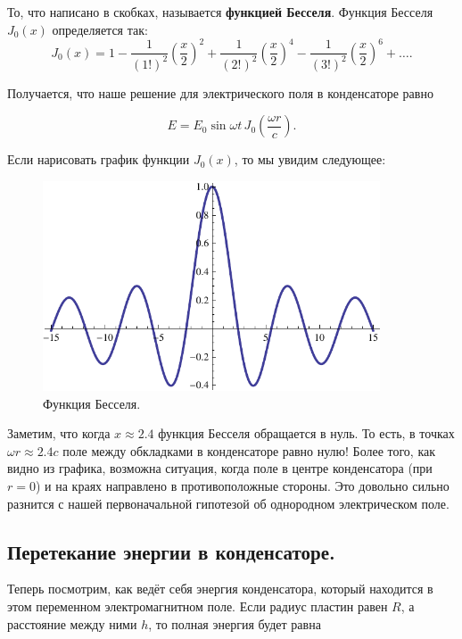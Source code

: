 \documentclass[11pt,a4paper]{article}
\numberwithin{equation}{section}
\begin{document}
То, что написано в скобках, называется \textbf{функцией
  Бесселя}. Функция Бесселя $J_0(x)$ определяется так: 
\begin{equation}
  \label{eq:def_bessel}
  J_0 (x) = 1 - \frac{1}{(1!)^2} \left(\frac{x}{2} \right)^2 +
  \frac{1}{(2!)^2} \left(\frac{x}{2} \right)^4 -  \frac{1}{(3!)^2}
  \left(\frac{x}{2} \right)^6 + \ldots.
\end{equation}

Получается, что наше решение для электрического поля в конденсаторе
равно 

\begin{equation}
  \label{eq:sol_conden}
  E = E_0 \sin \omega t\,  J_0 \left( \frac{\omega r}{c} \right). 
\end{equation}

Если нарисовать график функции $J_0 (x)$, то мы увидим следующее: 

\begin{figure}[h]
  \centering
  \includegraphics[width=10cm]{bessel.pdf}
  \caption{Функция Бесселя.}
  \label{fig:bessel}
\end{figure}

Заметим, что когда $x \approx 2.4$ функция Бесселя обращается в
нуль. То есть, в точках $\omega r \approx 2.4 c$ поле между обкладками
в конденсаторе равно нулю! Более того, как видно из графика,
возможна ситуация, когда поле в центре конденсатора (при $r=0$) и на
краях направлено в противоположные стороны. Это довольно сильно
разнится с нашей первоначальной гипотезой об однородном электрическом
поле. 

\subsection{Перетекание энергии в конденсаторе. }
\label{sec:energy_capacitor}

Теперь посмотрим, как ведёт себя энергия конденсатора, который
находится в этом переменном электромагнитном поле. Если радиус пластин
равен $R$, а расстояние между ними $h$, то полная энергия будет равна
\end{document}
